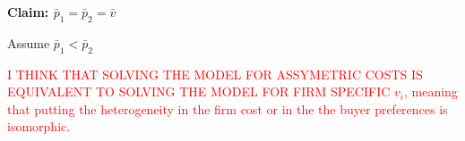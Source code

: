\documentclass[12pt]{article}
\theoremstyle{plain}
\theoremstyle{plain}
\begin{document}
\vspace{2cm}

\textbf{Claim: $\bar{p}_1 =\bar{p}_2 =\bar{v}$ } 

Assume $\bar{p}_1 < \bar{p}_2$

\textcolor{red}{I THINK THAT SOLVING THE MODEL FOR ASSYMETRIC COSTS IS EQUIVALENT TO SOLVING THE MODEL FOR FIRM SPECIFIC $v_i$, meaning that putting the heterogeneity in the firm cost or in the the buyer preferences is isomorphic. }


 
 


  

 
\end{document}
